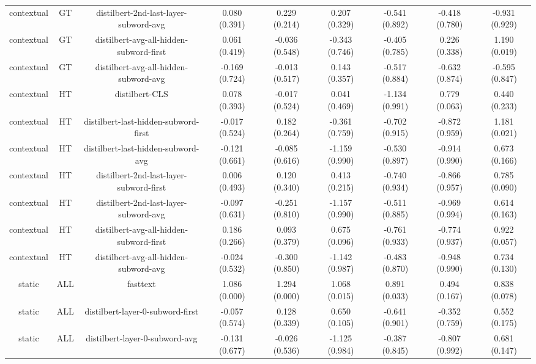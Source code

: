 \begin{sidewaystable}[htb]
\begin{tabular}{@{}ccccccccc@{}}
        contextual & GT & distilbert-2nd-last-layer-subword-avg & 0.080 (0.391) & 0.229 (0.214) & 0.207 (0.329) & -0.541 (0.892) & -0.418 (0.780) & -0.931 (0.929) \\
        contextual & GT & distilbert-avg-all-hidden-subword-first & 0.061 (0.419) & -0.036 (0.548) & -0.343 (0.746) & -0.405 (0.785) & 0.226 (0.338) & 1.190 (0.019) \\
        contextual & GT & distilbert-avg-all-hidden-subword-avg & -0.169 (0.724) & -0.013 (0.517) & 0.143 (0.357) & -0.517 (0.884) & -0.632 (0.874) & -0.595 (0.847) \\
        contextual & HT & distilbert-CLS & 0.078 (0.393) & -0.017 (0.524) & 0.041 (0.469) & -1.134 (0.991) & 0.779 (0.063) & 0.440 (0.233) \\
        contextual & HT & distilbert-last-hidden-subword-first & -0.017 (0.524) & 0.182 (0.264) & -0.361 (0.759) & -0.702 (0.915) & -0.872 (0.959) & 1.181 (0.021) \\
        contextual & HT & distilbert-last-hidden-subword-avg & -0.121 (0.661) & -0.085 (0.616) & -1.159 (0.990) & -0.530 (0.897) & -0.914 (0.990) & 0.673 (0.166) \\
        contextual & HT & distilbert-2nd-last-layer-subword-first & 0.006 (0.493) & 0.120 (0.340) & 0.413 (0.215) & -0.740 (0.934) & -0.866 (0.957) & 0.785 (0.090) \\
        contextual & HT & distilbert-2nd-last-layer-subword-avg & -0.097 (0.631) & -0.251 (0.810) & -1.157 (0.990) & -0.511 (0.885) & -0.969 (0.994) & 0.614 (0.163) \\
        contextual & HT & distilbert-avg-all-hidden-subword-first & 0.186 (0.266) & 0.093 (0.379) & 0.675 (0.096) & -0.761 (0.933) & -0.774 (0.937) & 0.922 (0.057) \\
        contextual & HT & distilbert-avg-all-hidden-subword-avg & -0.024 (0.532) & -0.300 (0.850) & -1.142 (0.987) & -0.483 (0.870) & -0.948 (0.990) & 0.734 (0.130) \\
        static & ALL & fasttext & 1.086 (0.000) & 1.294 (0.000) & 1.068 (0.015) & 0.891 (0.033) & 0.494 (0.167) & 0.838 (0.078) \\
        static & ALL & distilbert-layer-0-subword-first & -0.057 (0.574) & 0.128 (0.339) & 0.650 (0.105) & -0.641 (0.901) & -0.352 (0.759) & 0.552 (0.175) \\
        static & ALL & distilbert-layer-0-subword-avg & -0.131 (0.677) & -0.026 (0.536) & -1.125 (0.984) & -0.387 (0.845) & -0.807 (0.992) & 0.681 (0.147) \\

\end{tabular}
\end{sidewaystable}
